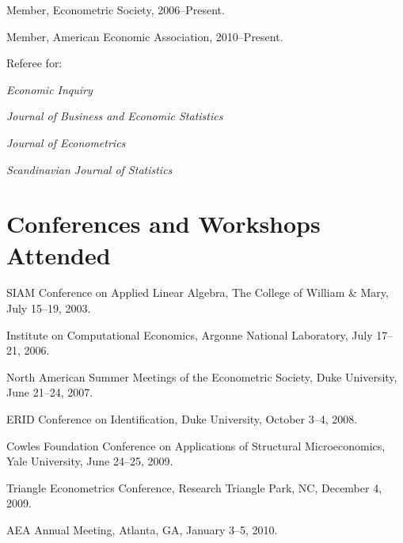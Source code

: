 \documentclass[10pt,letterpaper]{article}
\renewenvironment{itemize}{
  \begin{list}{}{
    \setlength{\leftmargin}{1.5em}
    \setlength{\itemsep}{0.25em}
    \setlength{\parskip}{0pt}
    \setlength{\parsep}{0.25em}
  }
}{
  \end{list}
}
\begin{document}
\begin{itemize}

\item Member, Econometric Society, 2006--Present.

\item Member, American Economic Association, 2010--Present.

\item Referee for:

  \begin{itemize}
  \item \textit{Economic Inquiry} %
  \item \textit{Journal of Business and Economic Statistics} %
  \item \textit{Journal of Econometrics} %
  \item \textit{Scandinavian Journal of Statistics} %
  \end{itemize}

\end{itemize}

\section*{Conferences and Workshops Attended}

\begin{itemize}

\item SIAM Conference on Applied Linear Algebra,
  The College of William \& Mary,
  July 15--19, 2003.

\item Institute on Computational Economics,
  Argonne National Laboratory,
  July 17--21, 2006.

\item North American Summer Meetings of the Econometric Society,
  Duke University,
  June 21--24, 2007.

\item ERID Conference on Identification,
  Duke University,
  October 3--4, 2008.

\item Cowles Foundation Conference on Applications of Structural Microeconomics,
  Yale University,
  June 24--25, 2009.

\item Triangle Econometrics Conference,
  Research Triangle Park, NC,
  December 4, 2009.

\item AEA Annual Meeting,
  Atlanta, GA, January 3--5, 2010.

\end{itemize}
\end{document}
